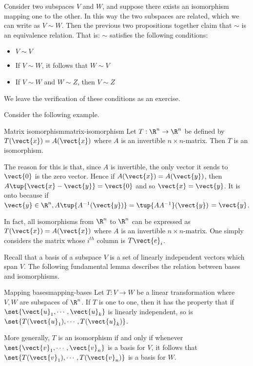 Consider two subspaces $V$ and $W$, and suppose there exists an isomorphism mapping one to the other. In this way the two subspaces are related, which we can write as $V \sim W$. Then the previous two propositions together claim that $\sim $ is an equivalence relation. That is: $\sim $
satisfies the following conditions:

\begin{itemize}
\item $V\sim V$

\item If $V\sim W$, it follows that $W\sim V$

\item If $V\sim W$ and $W\sim Z$, then $V\sim Z$
\end{itemize}

We leave the verification of these conditions as an exercise.

Consider the following example. 

\begin{example}{Matrix isomorphism}{matrix-isomorphism}
Let $T:\R^{n}\rightarrow \R^{n}$ be defined by $T(\vect{x}) = A(\vect{x})$ where $A$ is an invertible $n\times n$-matrix. Then $T$ is
an isomorphism.
\end{example}

\begin{solution}
The reason for this is that, since $A$ is invertible, the only vector it
sends to $\vect{0}$ is the zero vector. Hence if $A(\vect{x})=A(\vect{y})$, then $A\tup{\vect{x}-\vect{y}} =\vect{0}$ and so $\vect{x}=\vect{y}$. It is onto
because if $\vect{y}\in \R^{n},A\tup{A^{-1} (\vect{y})} =\tup{
AA^{-1}} (\vect{y})$ $=\vect{y}$. 
\end{solution}

In fact, all isomorphisms from $\R^{n}$ to $\R^{n}$ can be expressed as $T(\vect{x}) = A(\vect{x})$ where $A$ is an invertible $n \times n$-matrix. One
simply considers the matrix whose $i^{th}$ column is $T\vect{e}_{i}$.

Recall that a basis of a subspace $V$ is a set of linearly independent vectors which span $V$. The following fundamental lemma describes the relation between bases and
isomorphisms.

\begin{lemma}{Mapping bases}{mapping-bases}
Let $T:V\rightarrow W$ be a linear transformation where $V,W$ are
subspaces of $\R^n$. If $T$ is one to one, then it has the property that if $\set{\vect{u}_{1},\cdots ,\vect{u}_{k}} $ is linearly independent, so is $\set{T(\vect{u}_{1}),\cdots ,T(\vect{u}_{k})}$.

More generally, $T$ is an isomorphism if and only if whenever $\set{
\vect{v}_{1},\cdots ,\vect{v}_{n}} $ is a basis for $V$, it follows that $\set{T
(\vect{v}_{1}),\cdots ,T(\vect{v}_{n})} $ is a basis for $W$. 
\end{lemma}

